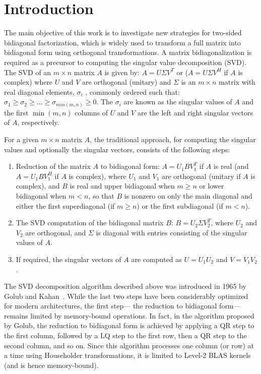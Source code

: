 \section{Introduction}
The main objective of this work is to investigate new strategies for
two-sided bidiagonal factorization,
which is widely used to
transform a full matrix into bidiagonal form using orthogonal transformations.
A matrix bidiagonalization is required as a precursor to computing the
singular value decomposition (SVD).
The SVD of an $m\times n$ matrix $A$ is given by:
$A = U \Sigma V^T$ or ($A = U \Sigma V^H$ if $A$ is complex) where
$U$ and $V$ are orthogonal (unitary) and $\Sigma$ is an $m\times n$
matrix with real diagonal elements, $\sigma_i$ , commonly ordered such
that: $\sigma_1 \ge \sigma_2 \ge \dots \ge \sigma_{min(m,n)} \ge 0.$
The $\sigma_i$ are known as the singular values of $A$
and the first $\min(m, n)$ columns
of $U$ and $V$ are the left and right singular vectors of $A$, respectively.

For a given $m\times n$ matrix $A$,
the traditional approach, for computing the singular
values and optionally the singular vectors,
consists of the following steps:
\begin{enumerate}
\item Reduction of the matrix $A$ to bidiagonal form:
$A = U_1BV^T_1$ if $A$ is real (and $A = U_1BV^H_1$ if $A$ is complex), where
  $U_1$ and $V_1$ are orthogonal (unitary if $A$ is complex), and $B$ is
  real and upper bidiagonal when $m \ge n$ or lower bidiagonal when $m < n$,
  so that $B$ is nonzero on only the main diagonal and either the first
  superdiagonal (if $m \ge n$) or the first subdiagonal (if $m < n$).

\item The SVD computation of the bidiagonal matrix $B$: $B = U_2 \Sigma
  V_2^T$, where $U_2$ and $V_2$ are orthogonal, and $\Sigma$ is
  diagonal with entries consisting of the singular values of $A$.
\item If required, the singular vectors of $A$ are computed as
  $U = U_1U_2$ and $V = V_1 V_2$.
\end{enumerate}

The SVD decomposition algorithm described above was introduced in
1965 by Golub and Kahan~\cite{golub1965calculating}.
While the last two steps have been considerably optimized
for modern architectures,
the first step---%
the reduction to bidiagonal form---%
remains limited by
memory-bound operations.
In fact, in the algorithm proposed by Golub,
the reduction to bidiagonal form is achieved by applying a QR step to
the first column, followed by a LQ step to the first row, then a QR
step to the second column, and so on. Since this algorithm processes
one column (or row) at a time using Householder transformations,
it is limited to Level-2 BLAS kernels (and is hence memory-bound).

